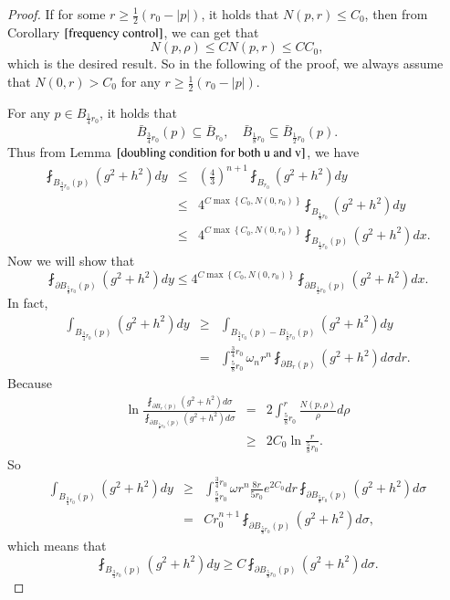 \documentclass[a4paper, 12pt, onecolumn]{article} \textwidth 148mm
\begin{document}
\begin{proof}

If for some $r\geq\frac{1}{2}(r_0-|p|)$, it holds that $N(p,r)\leq C_0$, then from Corollary $\ref{frequency control}$, we can get that
\begin{equation*}
N(p,\rho)\leq CN(p,r)\leq CC_0,
\end{equation*}
which is the desired result. So in the following of the proof, we always assume that $N(0,r)>C_0$ for any $r\geq\frac{1}{2}(r_0-|p|)$.

For any $p\in B_{\frac{1}{4}r_0}$, it holds that
\begin{equation}\label{containning relationship of balls}
\bar{B}_{\frac{3}{4}r_0}(p)\subseteq\bar{B}_{r_0},\quad \bar{B}_{\frac{1}{8}r_0}\subseteq \bar{B}_{\frac{1}{2}r_0}(p).
\end{equation}
Thus from Lemma $\ref{doubling condition for both u and v}$, we have
\begin{eqnarray}\label{change ball inequality}
\fint_{B_{\frac{3}{4}r_0}(p)}(g^2+h^2)dy&\leq&\left(\frac{4}{3}\right)^{n+1}\fint_{B_{r_0}}(g^2+h^2)dy \nonumber
\\&\leq&4^{C\max\left\{C_0, N(0,r_0)\right\}}\fint_{B_{\frac{1}{8}r_0}}(g^2+h^2)dy \nonumber
\\&\leq&4^{C\max\left\{C_0, N(0,r_0)\right\}}\fint_{B_{\frac{1}{2}r_0}(p)}(g^2+h^2)dx.
\end{eqnarray}
Now we will show that
\begin{equation}\label{key claim for this lemma}
\fint_{\partial B_{\frac{5}{8}r_0}(p)}(g^2+h^2)dy\leq4^{C\max\left\{C_0,N(0,r_0)\right\}}\fint_{\partial B_{\frac{1}{2}r_0}(p)}(g^2+h^2)dx.
\end{equation}
In fact,
\begin{eqnarray*}
\int_{B_{\frac{3}{4}r_0}(p)}(g^2+h^2)dy&\geq&\int_{B_{\frac{3}{4}r_0}(p)-B_{\frac{5}{8}r_0}(p)}(g^2+h^2)dy
\\&=&\int_{\frac{5}{8}r_0}^{\frac{3}{4}r_0}\omega_nr^n\fint_{\partial B_r(p)}(g^2+h^2)d\sigma dr.
\end{eqnarray*}
Because
\begin{eqnarray*}
\ln\frac{\fint_{\partial B_r(p)}(g^2+h^2)d\sigma}{\fint_{\partial B_{\frac{5}{8}r_0}(p)}(g^2+h^2)d\sigma}
&=&2\int_{\frac{5}{8}r_0}^r\frac{N(p,\rho)}{\rho}d\rho
\\&\geq&2C_0\ln\frac{r}{\frac{5}{8}r_0}.
\end{eqnarray*}
So
\begin{eqnarray*}
\int_{B_{\frac{3}{4}r_0}(p)}(g^2+h^2)dy&\geq&\int_{\frac{5}{8}r_0}^{\frac{3}{4}r_0}\omega r^n\frac{8r}{5r_0}e^{2C_0}dr\fint_{\partial B_{\frac{5}{8}r_0}(p)}(g^2+h^2)d\sigma
\\&=&Cr_0^{n+1}\fint_{\partial B_{\frac{5}{8}r_0}(p)}(g^2+h^2)d\sigma,
\end{eqnarray*}
which means that
\begin{equation}\label{inequality 1 for key inequality}
\fint_{B_{\frac{3}{4}r_0}(p)}(g^2+h^2)dy\geq C\fint_{\partial B_{\frac{5}{8}r_0}(p)}(g^2+h^2)d\sigma.
\end{equation}


\end{proof}
\end{document}
